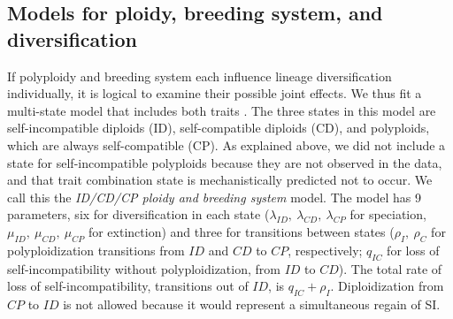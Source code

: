 \subsection{Models for ploidy, breeding system, and diversification}

If polyploidy and breeding system each influence lineage diversification individually, it is logical to examine their possible joint effects. %
We thus fit a multi-state model that includes both traits \citep[MuSSE,][]{fitzjohn_2012}.
The three states in this model are self-incompatible diploids (ID), self-compatible diploids (CD), and polyploids, which are always self-compatible (CP).
As explained above, we did not include a state for self-incompatible polyploids because they are not observed in the data, and  that trait combination state is mechanistically predicted not to occur.
We call this the \textit{ID/CD/CP ploidy and breeding system} model.
The model has 9 parameters, six for diversification in each state ($\lambda_{ID},\ \lambda_{CD},\ \lambda_{CP}$ for speciation, $\mu_{ID},\ \mu_{CD},\ \mu_{CP}$ for extinction) and three for transitions between states ($\rho_I,\ \rho_C$ for polyploidization transitions from $ID$ and $CD$ to $CP$, respectively; $q_{IC}$ for loss of self-incompatibility without polyploidization, from $ID$ to $CD$).
The total rate of loss of self-incompatibility, \ie transitions out of $ID$, is $q_{IC} + \rho_I$.
Diploidization from $CP$ to $ID$ is not allowed because it would represent a simultaneous regain of SI.


